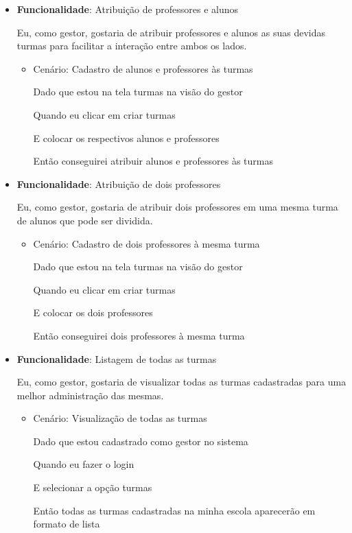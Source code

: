 \documentclass[
    12pt,               %
    openright,          %
    oneside,
    a4paper,            %
    english,            %
    brazil              %
    ]{ifsp-spo-inf-ctds} %
\begin{document}
\begin{itemize}
\item\textbf{Funcionalidade}: Atribuição de professores e alunos
    
    Eu, como gestor, gostaria de atribuir professores e alunos as suas devidas turmas para facilitar a interação entre ambos os lados.
    \begin{itemize}
        \item Cenário: Cadastro de alunos e professores às turmas
        \par Dado que estou na tela turmas na visão do gestor
        \par Quando eu clicar em criar turmas
        \par E colocar os respectivos alunos e professores
        \par Então conseguirei atribuir alunos e professores às turmas
    \end{itemize}

\item\textbf{Funcionalidade}: Atribuição de dois professores 
    
    Eu, como gestor, gostaria de atribuir dois professores em uma mesma turma de alunos que pode ser dividida.
    \begin{itemize}
        \item Cenário: Cadastro de dois professores à mesma turma
        \par Dado que estou na tela turmas na visão do gestor
        \par Quando eu clicar em criar turmas
        \par E colocar os dois professores
        \par Então conseguirei dois professores à mesma turma
    \end{itemize}

\item\textbf{Funcionalidade}: Listagem de todas as turmas
    
    Eu, como gestor, gostaria de visualizar todas as turmas cadastradas para uma melhor administração das mesmas.
    \begin{itemize}
        \item Cenário: Visualização de todas as turmas 
        \par Dado que estou cadastrado como gestor no sistema
        \par Quando eu fazer o login
        \par E selecionar a opção turmas
        \par Então todas as turmas cadastradas na minha escola aparecerão em formato de lista
    \end{itemize}  


\end{itemize}
\end{document}
